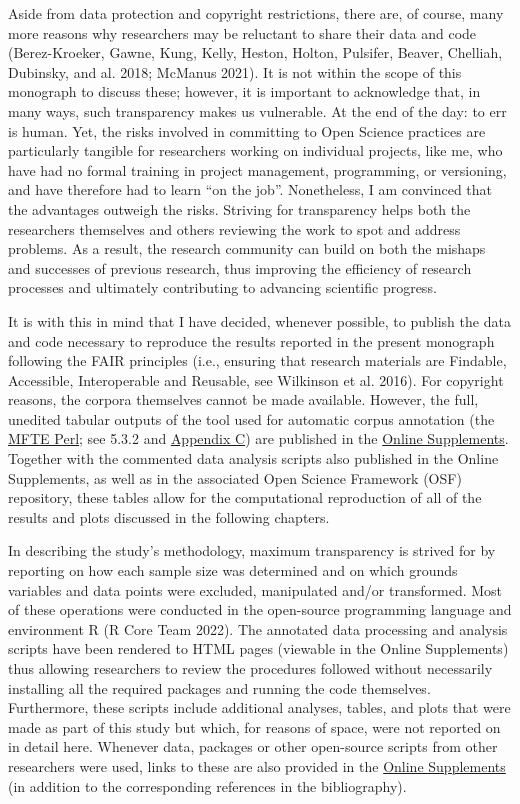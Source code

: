 \documentclass[
  letterpaper,
  DIV=11,
  numbers=noendperiod]{scrreprt}
\begin{document}
Aside from data protection and copyright restrictions, there are, of
course, many more reasons why researchers may be reluctant to share
their data and code (Berez-Kroeker, Gawne, Kung, Kelly, Heston, Holton,
Pulsifer, Beaver, Chelliah, Dubinsky, and al. 2018; McManus 2021). It is
not within the scope of this monograph to discuss these; however, it is
important to acknowledge that, in many ways, such transparency makes us
vulnerable. At the end of the day: to err is human. Yet, the risks
involved in committing to Open Science practices are particularly
tangible for researchers working on individual projects, like me, who
have had no formal training in project management, programming, or
versioning, and have therefore had to learn ``on the job''. Nonetheless,
I am convinced that the advantages outweigh the risks. Striving for
transparency helps both the researchers themselves and others reviewing
the work to spot and address problems. As a result, the research
community can build on both the mishaps and successes of previous
research, thus improving the efficiency of research processes and
ultimately contributing to advancing scientific progress.

It is with this in mind that I have decided, whenever possible, to
publish the data and code necessary to reproduce the results reported in
the present monograph following the FAIR principles (i.e., ensuring that
research materials are Findable, Accessible, Interoperable and Reusable,
see Wilkinson et al. 2016). For copyright reasons, the corpora
themselves cannot be made available. However, the full, unedited tabular
outputs of the tool used for automatic corpus annotation (the
\href{https://github.com/elenlefoll/MultiFeatureTaggerEnglish}{MFTE
Perl}; see 5.3.2 and
\href{https://elenlefoll.github.io/TextbookMDA/AppendixC.html}{Appendix
C}) are published in the
\href{https://elenlefoll.github.io/TextbookMDA}{Online Supplements}.
Together with the commented data analysis scripts also published in the
Online Supplements, as well as in the associated Open Science Framework
(OSF) repository, these tables allow for the computational reproduction
of all of the results and plots discussed in the following chapters.

In describing the study's methodology, maximum transparency is strived
for by reporting on how each sample size was determined and on which
grounds variables and data points were excluded, manipulated and/or
transformed. Most of these operations were conducted in the open-source
programming language and environment R (R Core Team 2022). The annotated
data processing and analysis scripts have been rendered to HTML pages
(viewable in the Online Supplements) thus allowing researchers to review
the procedures followed without necessarily installing all the required
packages and running the code themselves. Furthermore, these scripts
include additional analyses, tables, and plots that were made as part of
this study but which, for reasons of space, were not reported on in
detail here. Whenever data, packages or other open-source scripts from
other researchers were used, links to these are also provided in the
\href{https://elenlefoll.github.io/TextbookMDA/references.html}{Online
Supplements} (in addition to the corresponding references in the
bibliography).
\end{document}
